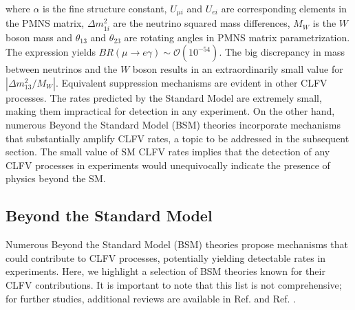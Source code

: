 where $\alpha$ is the fine structure constant, $U_{\mu i}$ and $U_{ei}$ are corresponding elements in the PMNS matrix, $\Delta m_{1i}^2$ are the neutrino squared mass differences, $M_W$ is the $W$ boson mass and $\theta_{13}$ and $\theta_{23}$ are rotating angles in PMNS matrix parametrization. The expression yields $B R(\mu \rightarrow e \gamma) \sim \mathcal{O}(10^{-54})$. The big discrepancy in mass between neutrinos and the $W$ boson results in an extraordinarily small value for $|\Delta m_{13}^2/M_W|$. Equivalent suppression mechanisms are evident in other CLFV processes. The rates predicted by the Standard Model are extremely small, making them impractical for detection in any experiment. On the other hand, numerous Beyond the Standard Model (BSM) theories incorporate mechanisms that substantially amplify CLFV rates, a topic to be addressed in the subsequent section. The small value of SM CLFV rates implies that the detection of any CLFV processes in experiments would unequivocally indicate the presence of physics beyond the SM.
\subsection{Beyond the Standard Model}
Numerous Beyond the Standard Model (BSM) theories propose mechanisms that could contribute to CLFV processes, potentially yielding detectable rates in experiments. Here, we highlight a selection of BSM theories known for their CLFV contributions. It is important to note that this list is not comprehensive; for further studies, additional reviews are available in Ref. \cite{clfv_signorelli} and Ref. \cite{universe8060299}.
